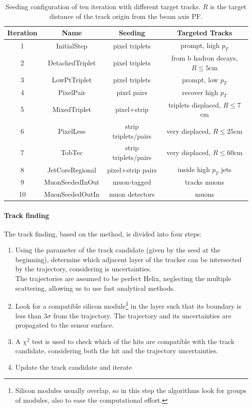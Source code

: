 \begin{table}[h!]
    \centering
    \begin{tabular}{|c|c|c|c|}
    \hline
    Iteration&Name&Seeding&Targeted Tracks\\
    \hline
    1& InitialStep&pixel triplets&prompt, high $p_T$\\
    2& DetachedTriplet&pixel triplets&from b hadron decays, $R\leq 5$cm\\
    3& LowPtTriplet&pixel triplets&prompt, low $p_T$\\
    4& PixelPair&pixel pairs&recover high $p_T$\\
    5& MixedTriplet&pixel+strip&triplets displaced, $R\leq 7$cm\\
    6& PixelLess&strip triplets/pairs&very displaced, $R\leq 25$cm\\
    7& TobTec&strip triplets/pairs&very displaced, $R\leq 60$cm\\
    8& JetCoreRegional&pixel+strip pairs&inside high $p_T$ jets\\
    9& MuonSeededInOut&muon-tagged&tracks muons\\
    10& MuonSeededOutIn&muon detectors&muons \\
    \hline
    \end{tabular}
    \caption{Seeding configuration of ten iteration with different target tracks. $R$ is the target distance of the track origin from the beam axis \ADDREF PF. }
    \label{tab:track_seeding}
\end{table}

\paragraph*{Track finding}
The track finding, based on the method, is divided into four steps:
\begin{enumerate}
    \item Using the parameter of the track candidate (given by the seed at the beginning), determine which adjacent layer of the tracker can be intersected by the trajectory, considering is uncertainties.\\ The trajectories are assumed to be perfect Helix, neglecting the multiple scattering, allowing us to use fast analytical methods.
    \item Look for a compatible silicon module\footnote{Silicon modules usually overlap, so in this step the algorithms look for groups of modules, also to ease the computational effort.} in the layer such that its boundary is less than $3 \sigma$ from the trajectory. The trajectory and its uncertainties are propagated to the sensor surface.
    \item A $\chi^2$ test is used to check which of the hits are compatible with the track candidate, considering both the hit and the trajectory uncertainties.
    \item Update the track candidate and iterate
\end{enumerate}
